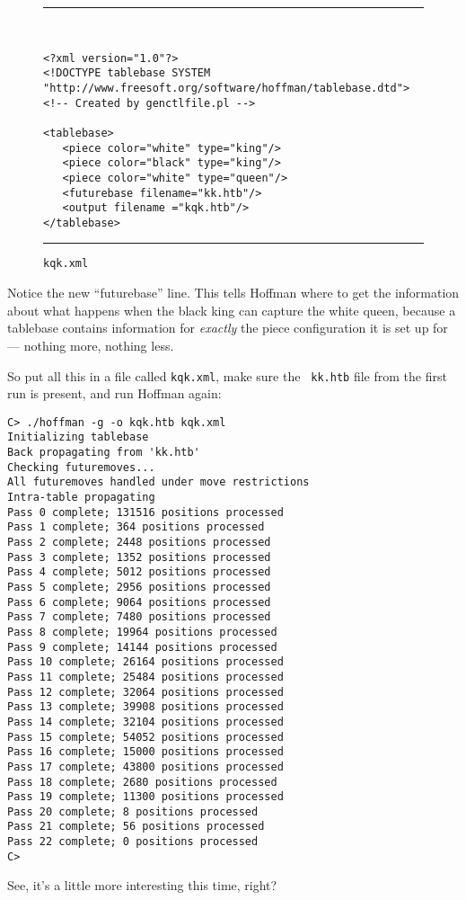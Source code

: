 \documentclass[11pt]{article}
\begin{document}
\begin{figure}
\hrule\ 
{\small\begin{verbatim}
<?xml version="1.0"?>
<!DOCTYPE tablebase SYSTEM "http://www.freesoft.org/software/hoffman/tablebase.dtd">
<!-- Created by genctlfile.pl -->

<tablebase>
   <piece color="white" type="king"/>
   <piece color="black" type="king"/>
   <piece color="white" type="queen"/>
   <futurebase filename="kk.htb"/>
   <output filename ="kqk.htb"/>
</tablebase>
\end{verbatim}}
\hrule
\caption{\tt kqk.xml}
\end{figure}

Notice the new ``futurebase'' line.  This tells Hoffman where to get
the information about what happens when the black king can capture the
white queen, because a tablebase contains information for {\it
exactly} the piece configuration it is set up for --- nothing
more, nothing less.

So put all this in a file called {\tt kqk.xml}, make sure the {\tt
kk.htb} file from the first run is present, and run Hoffman again:

\begin{verbatim}
C> ./hoffman -g -o kqk.htb kqk.xml
Initializing tablebase
Back propagating from 'kk.htb'
Checking futuremoves...
All futuremoves handled under move restrictions
Intra-table propagating
Pass 0 complete; 131516 positions processed
Pass 1 complete; 364 positions processed
Pass 2 complete; 2448 positions processed
Pass 3 complete; 1352 positions processed
Pass 4 complete; 5012 positions processed
Pass 5 complete; 2956 positions processed
Pass 6 complete; 9064 positions processed
Pass 7 complete; 7480 positions processed
Pass 8 complete; 19964 positions processed
Pass 9 complete; 14144 positions processed
Pass 10 complete; 26164 positions processed
Pass 11 complete; 25484 positions processed
Pass 12 complete; 32064 positions processed
Pass 13 complete; 39908 positions processed
Pass 14 complete; 32104 positions processed
Pass 15 complete; 54052 positions processed
Pass 16 complete; 15000 positions processed
Pass 17 complete; 43800 positions processed
Pass 18 complete; 2680 positions processed
Pass 19 complete; 11300 positions processed
Pass 20 complete; 8 positions processed
Pass 21 complete; 56 positions processed
Pass 22 complete; 0 positions processed
C>
\end{verbatim}

See, it's a little more interesting this time, right?
\end{document}
